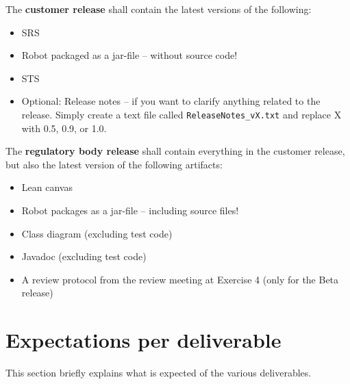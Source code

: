 \documentclass{scrreprt}
\begin{document}
The \textbf{customer release} shall contain the latest versions of the following:

\begin{itemize}
\item SRS
\item Robot packaged as a jar-file -- without source code!
\item STS
\item Optional: Release notes -- if you want to clarify anything related to the release. Simply create a text file called \texttt{ReleaseNotes_vX.txt} and replace X with 0.5, 0.9, or 1.0.
\end{itemize}

The \textbf{regulatory body release} shall contain everything in the customer release, but also the latest version of the following artifacts:
\begin{itemize}
\item Lean canvas
\item Robot packages as a jar-file -- including source files!
\item Class diagram (excluding test code)
\item Javadoc (excluding test code)
\item A review protocol from the review meeting at Exercise 4 (only for the Beta release)
\end{itemize}

\chapter{Expectations per deliverable}
This section briefly explains what is expected of the various deliverables.
\end{document}

